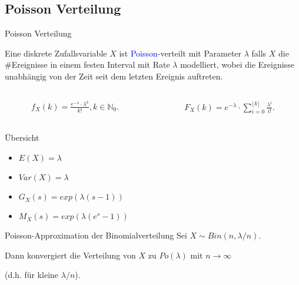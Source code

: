 \documentclass{beamer}
\def\padding{\vspace{0.5cm}}
\def\b{\textcolor{blue}}
\begin{document}
\subsection{Poisson Verteilung}
\begin{frame}{Poisson Verteilung}
    \begin{definition}
        Eine diskrete Zufallsvariable $X$ ist \b{Poisson}-verteilt mit Parameter $\lambda$ falls $X$ die \#Ereignisse in einem festen Interval mit Rate $\lambda$ modelliert, wobei die Ereignisse unabhängig von der Zeit seit dem letzten Ereignis auftreten.
    \end{definition}\pause
    \begin{columns}
        \begin{column}{0.5\textwidth}
           \begin{align*}
                f_X(k) = \frac{e^{- \lambda} \cdot \lambda^k}{k!}, k \in \mathbb{N}_0.
            \end{align*}
        \end{column}\pause
        \begin{column}{0.5\textwidth}
            \begin{align*}
                F_X(k) = e^{- \lambda} \cdot \sum_{i=0}^{\lfloor k \rfloor} \frac{\lambda^i}{i!}.
            \end{align*}
        \end{column}
    \end{columns}\pause\par\padding
    \begin{exampleblock}{Übersicht}
        \begin{itemize}
            \item $E(X) = \lambda$\pause
            \item $Var(X) = \lambda$\pause
            \item $G_X(s) = exp(\lambda (s - 1))$
            \item $M_X(s) = exp(\lambda (e^s - 1))$
        \end{itemize}
    \end{exampleblock}
\end{frame}

\begin{frame}
    \begin{block}{Poisson-Approximation der Binomialverteilung}
        Sei $X \sim Bin(n, \lambda / n)$.\pause\par
        Dann konvergiert die Verteilung von $X$ zu $Po(\lambda)$ mit $n \to \infty$\pause\par
        (d.h. für kleine $\lambda / n$).
    \end{block}
\end{frame}
\end{document}
